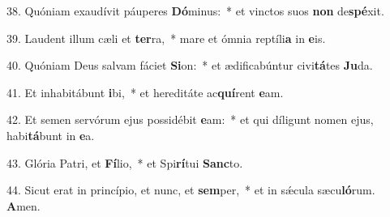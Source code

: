 38. Quóniam exaudívit páuperes \textbf{Dó}minus:~*  et vinctos suos \textbf{non} de\textbf{spé}xit.\

39. Laudent illum cæli et \textbf{ter}ra,~*  mare et ómnia reptíli\textbf{a} in \textbf{e}is.\

40. Quóniam Deus salvam fáciet \textbf{Si}on:~*  et ædificabúntur civi\textbf{tá}tes \textbf{Ju}da.\

41. Et inhabitábunt \textbf{i}bi,~*  et hereditáte ac\textbf{quí}rent \textbf{e}am.\

42. Et semen servórum ejus possidébit \textbf{e}am:~*  et qui díligunt nomen ejus, habi\textbf{tá}bunt in \textbf{e}a.\

43. Glória Patri, et \textbf{Fí}lio,~*  et Spi\textbf{rí}tui \textbf{Sanc}to.\

44. Sicut erat in princípio, et nunc, et \textbf{sem}per,~*  et in sǽcula sæcu\textbf{ló}rum. \textbf{A}men.\

